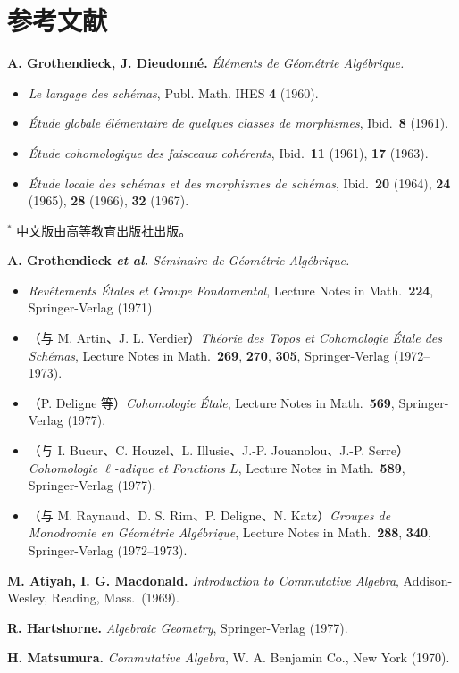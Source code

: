 \clearpage
\section*{参考文献}

\begingroup
\setlength{\parindent}{0pt}
\setlength{\parskip}{0.55em}

\textbf{A. Grothendieck, J. Dieudonné.} \emph{Éléments de Géométrie Algébrique.}
\begin{itemize}[leftmargin=2.6em,itemsep=0.18em,topsep=0.15em,labelsep=0.4em]
  \item[\textbf{EGA I}] \emph{Le langage des schémas}, Publ. Math. IHES \textbf{4} (1960).
  \item[\textbf{EGA II}] \emph{Étude globale élémentaire de quelques classes de morphismes}, Ibid.\ \textbf{8} (1961).
  \item[\textbf{EGA III}] \emph{Étude cohomologique des faisceaux cohérents}, Ibid.\ \textbf{11} (1961), \textbf{17} (1963).
  \item[\textbf{EGA IV}] \emph{Étude locale des schémas et des morphismes de schémas}, Ibid.\ \textbf{20} (1964), \textbf{24} (1965), \textbf{28} (1966), \textbf{32} (1967).
\end{itemize}
{\small $^\ast$ 中文版由高等教育出版社出版。}

\medskip
\textbf{A. Grothendieck \emph{et al.}} \emph{Séminaire de Géométrie Algébrique.}
\begin{itemize}[leftmargin=2.6em,itemsep=0.18em,topsep=0.15em,labelsep=0.4em]
  \item[\textbf{SGA 1}] \emph{Revêtements Étales et Groupe Fondamental}, Lecture Notes in Math.\ \textbf{224}, Springer-Verlag (1971).
  \item[\textbf{SGA 4}] （与 M. Artin、J. L. Verdier）\emph{Théorie des Topos et Cohomologie Étale des Schémas}, Lecture Notes in Math.\ \textbf{269}, \textbf{270}, \textbf{305}, Springer-Verlag (1972--1973).
  \item[\textbf{SGA $4\frac{1}{2}$}] （P. Deligne 等）\emph{Cohomologie Étale}, Lecture Notes in Math.\ \textbf{569}, Springer-Verlag (1977).
  \item[\textbf{SGA 5}] （与 I. Bucur、C. Houzel、L. Illusie、J.-P. Jouanolou、J.-P. Serre）\emph{Cohomologie $\ell$-adique et Fonctions $L$}, Lecture Notes in Math.\ \textbf{589}, Springer-Verlag (1977).
  \item[\textbf{SGA 7}] （与 M. Raynaud、D. S. Rim、P. Deligne、N. Katz）\emph{Groupes de Monodromie en Géométrie Algébrique}, Lecture Notes in Math.\ \textbf{288}, \textbf{340}, Springer-Verlag (1972--1973).
\end{itemize}

\medskip
\textbf{M. Atiyah, I. G. Macdonald.} \emph{Introduction to Commutative Algebra}, Addison-Wesley, Reading, Mass.\ (1969).

\textbf{R. Hartshorne.} \emph{Algebraic Geometry}, Springer-Verlag (1977).

\textbf{H. Matsumura.} \emph{Commutative Algebra}, W. A. Benjamin Co., New York (1970).

\endgroup
